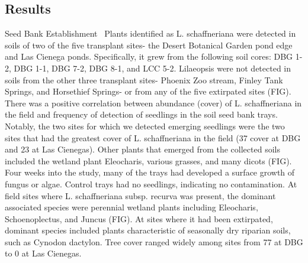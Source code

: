 \documentclass[multicol]{elsarticle}
\begin{document}
\begin{multicols}{2}
\section{Results}
\begin{subsection}{Seed Bank Establishment}
\,
Plants identified as L. schaffneriana were detected in soils of two of the five transplant sites- the Desert Botanical Garden pond edge and Las Cienega ponds. Specifically, it grew from the following soil cores: DBG 1-2, DBG 1-1, DBG 7-2, DBG 8-1, and LCC 5-2. Lilaeopsis were not detected in soils from the other three transplant sites- Phoenix Zoo stream, Finley Tank Springs, and Horsethief Springs- or from any of the five extirpated sites (FIG). There was a positive correlation between abundance (cover) of L. schaffneriana in the field and frequency of detection of seedlings in the soil seed bank trays. Notably, the two sites for which we detected emerging seedlings were the two sites that had the greatest cover of L. schaffneriana in the field (37 cover at DBG and 23 at Las Cienegas). Other plants that emerged from the collected soils included the wetland plant Eleocharis, various grasses, and many dicots (FIG). Four weeks into the study, many of the trays had developed a surface growth of fungus or algae. Control trays had no seedlings, indicating no contamination. At field sites where L. schaffneriana subsp. recurva was present, the dominant associated species were perennial wetland plants including Eleocharis, Schoenoplectus, and Juncus (FIG). At sites where it had been extirpated, dominant species included plants characteristic of seasonally dry riparian soils, such as Cynodon dactylon.  Tree cover ranged widely among sites from 77 at DBG to 0 at Las Cienegas. 
\end{subsection}


\end{multicols}
\end{document}
